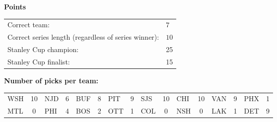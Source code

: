 \documentclass[10pt]{article}
\begin{document}
{\bf Points}\\
\begin{minipage}{12cm}
    \begin{tabular}{l l}
        Correct team:	& $7$\\
        Correct series length (regardless of series winner):	& $10$\\
        Stanley Cup champion:	& 25\\
        Stanley Cup finalist:	& 15\\
    \end{tabular}

    \vspace{1cm}
    {\bf Number of picks per team:}\\
    \begin{tabular}{lc | lc | lc | lc | lc | lc | lc | lc }
        WSH & 10 & NJD & 6 & BUF & 8 & PIT & 9 & SJS & 10 & CHI & 10 & VAN & 9 & PHX & 1 \\
        MTL & 0 & PHI & 4 & BOS & 2 & OTT & 1 & COL & 0 & NSH & 0 & LAK & 1 & DET & 9 \\
    \end{tabular}
\end{minipage}
\end{document}
